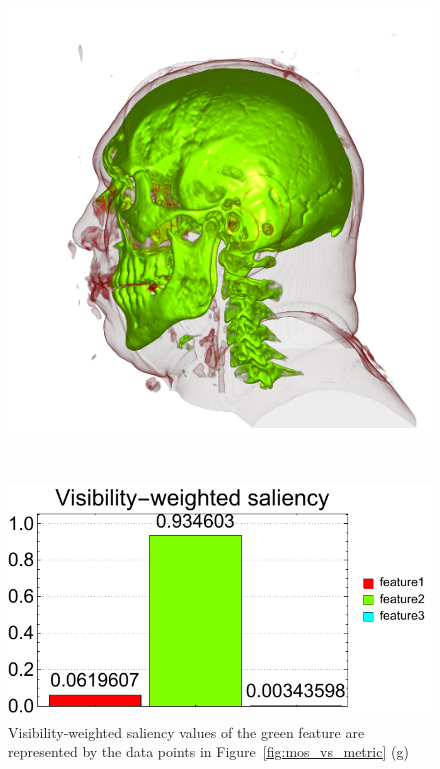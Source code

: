 \begin{figure}
\begin{minipage}{.24\textwidth}
		\includegraphics[width=1\linewidth]{images/vismale_strong_green}
		\subcaption{}
	\end{minipage}~
	\begin{minipage}{.25\textwidth}
		\includegraphics[width=1\linewidth]{figures/vismale_strong_green_visibility_saliency_weighted_chart}
		\subcaption{}
	\end{minipage}
	\caption{Visibility-weighted saliency values of the green feature are represented by the data points in Figure~\ref{fig:mos_vs_metric} (g)}
	\label{fig:vismale_feature2_charts}
\end{figure}

